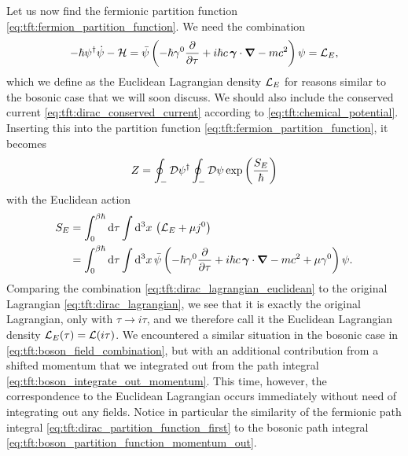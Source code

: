 Let us now find the fermionic partition function \eqref{eq:tft:fermion_partition_function}.
We need the combination
\begin{equation}
	-\hbar \psi^\dagger \dot\psi - \mathcal{H} =
	\bar\psi \left( -\hbar \gamma^0 \pdv{}{\tau} + i \hbar c \, {\bm{\gamma}} \cdot {\bm{\nabla}} - mc^2 \right) \psi =
	\mathcal{L}_E ,
\label{eq:tft:dirac_lagrangian_euclidean}
\end{equation}
which we define as the Euclidean Lagrangian density $\mathcal{L}_E$ for reasons similar to the bosonic case that we will soon discuss.
We should also include the conserved current \eqref{eq:tft:dirac_conserved_current} according to \cref{eq:tft:chemical_potential}.
Inserting this into the partition function \eqref{eq:tft:fermion_partition_function}, it becomes
\begin{equation}
	Z = \oint_- \mathcal{D} \psi^\dagger \oint_- \mathcal{D} \psi
	    \exp \left( \frac{S_E}{\hbar} \right)
\label{eq:tft:dirac_partition_function_first}
\end{equation}
with the Euclidean action
\begin{equation}
\begin{split}
	S_E &= \int_0^{\beta \hbar} \mathop{}\!\mathrm{d} \tau \int \mathop{}\!\mathrm{d}^3 x \, \left( \mathcal{L}_E + \mu j^0 \right) \\
	    &= \int_0^{\beta \hbar} \mathop{}\!\mathrm{d} \tau \int \mathop{}\!\mathrm{d}^3 x \, \bar\psi \left( -\hbar \gamma^0 \pdv{}{\tau} + i \hbar c \, {\bm{\gamma}} \cdot {\bm{\nabla}} - mc^2 + \mu \gamma^0 \right) \psi .
\end{split}
\label{eq:tft:dirac_action_euclidean}
\end{equation}
Comparing the combination \eqref{eq:tft:dirac_lagrangian_euclidean} to the original Lagrangian \eqref{eq:tft:dirac_lagrangian}, we see that it is exactly the original Lagrangian, only with $\tau \rightarrow i \tau$, and we therefore call it the Euclidean Lagrangian density $\mathcal{L}_E(\tau) = \mathcal{L}(i \tau)$.
We encountered a similar situation in the bosonic case in \cref{eq:tft:boson_field_combination}, but with an additional contribution from a shifted momentum that we integrated out from the path integral \eqref{eq:tft:boson_integrate_out_momentum}.
This time, however, the correspondence to the Euclidean Lagrangian occurs immediately without need of integrating out any fields.
Notice in particular the similarity of the fermionic path integral \eqref{eq:tft:dirac_partition_function_first} to the bosonic path integral \eqref{eq:tft:boson_partition_function_momentum_out}.

